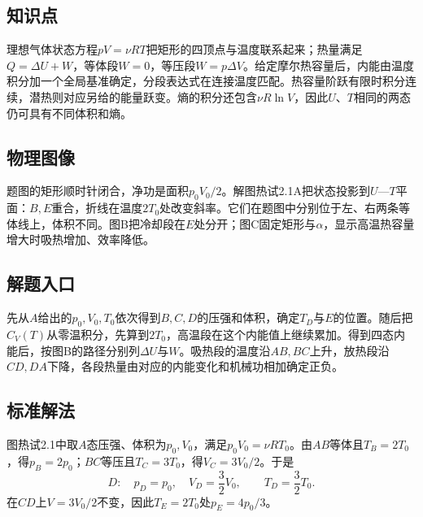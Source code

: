 \documentclass[UTF8,fontset=fandol,a4paper,11pt]{ctexart}
\begin{document}


\subsection*{知识点}

理想气体状态方程$pV=\nu RT$把矩形的四顶点与温度联系起来；热量满足$Q=\Delta U+W$，等体段$W=0$，等压段$W=p\Delta V$。给定摩尔热容量后，内能由温度积分加一个全局基准确定，分段表达式在连接温度匹配。热容量阶跃有限时积分连续，潜热则对应另给的能量跃变。熵的积分还包含$\nu R\ln V$，因此$U$、$T$相同的两态仍可具有不同体积和熵。



\subsection*{物理图像}

题图的矩形顺时针闭合，净功是面积$p_0V_0/2$。解图热试2.1A把状态投影到$U$—$T$平面：$B,E$重合，折线在温度$2T_0$处改变斜率。它们在题图中分别位于左、右两条等体线上，体积不同。图B把冷却段在$E$处分开；图C固定矩形与$\alpha$，显示高温热容量增大时吸热增加、效率降低。



\subsection*{解题入口}

先从$A$给出的$p_0,V_0,T_0$依次得到$B,C,D$的压强和体积，确定$T_D$与$E$的位置。随后把$C_V(T)$从零温积分，先算到$2T_0$，高温段在这个内能值上继续累加。得到四态内能后，按图B的路径分别列$\Delta U$与$W$。吸热段的温度沿$AB,BC$上升，放热段沿$CD,DA$下降，各段热量由对应的内能变化和机械功相加确定正负。



\subsection*{标准解法}


图热试2.1中取$A$态压强、体积为$p_0,V_0$，满足$p_0V_0=\nu RT_0$。由$AB$等体且$T_B=2T_0$，得$p_B=2p_0$；$BC$等压且$T_C=3T_0$，得$V_C=3V_0/2$。于是
\[
D:\quad p_D=p_0,\quad V_D=\frac32V_0,
\qquad
\boxed{T_D=\frac32T_0}.
\]
在$CD$上$V=3V_0/2$不变，因此$T_E=2T_0$处$p_E=4p_0/3$。
\end{document}
